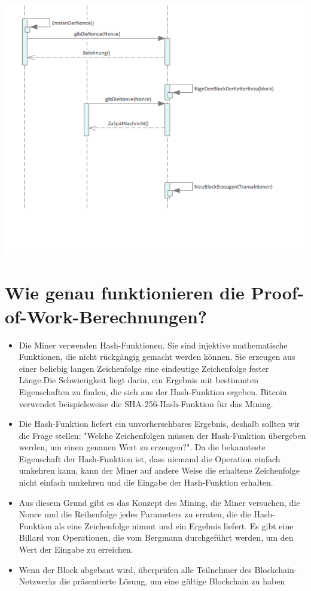 \documentclass[ngerman]{scrreprt}
\begin{document}
\includegraphics[width=\linewidth]{ProofOfWork2.png}
\section{Wie genau funktionieren die Proof-of-Work-Berechnungen?}
\begin{itemize}
	\item {Die Miner verwenden Hash-Funktionen. Sie sind injektive mathematische Funktionen, die nicht rückgängig gemacht werden können. Sie erzeugen aus einer beliebig langen Zeichenfolge eine eindeutige Zeichenfolge fester Länge.Die Schwierigkeit liegt darin, ein Ergebnis mit bestimmten Eigenschaften zu finden, die sich aus der Hash-Funktion ergeben. Bitcoin verwendet beispielsweise die SHA-256-Hash-Funktion für das Mining.}
	\item{Die Hash-Funktion liefert ein unvorhersehbares Ergebnis, deshalb sollten wir die Frage stellen: "Welche Zeichenfolgen müssen der Hash-Funktion übergeben werden, um einen genauen Wert zu erzeugen?". Da die bekannteste Eigenschaft der Hash-Funktion ist, dass niemand die Operation einfach umkehren kann, kann der Miner auf andere Weise die erhaltene Zeichenfolge nicht einfach umkehren und die Eingabe der Hash-Funktion erhalten.}
	\item{Aus diesem Grund gibt es das Konzept des Mining, die Miner versuchen, die Nonce und die Reihenfolge jedes Parameters zu erraten, die die Hash-Funktion als eine Zeichenfolge nimmt und ein Ergebnis liefert. Es gibt eine Billard von Operationen, die vom Bergmann durchgeführt werden, um den Wert der Eingabe zu erreichen.}
	\item{Wenn der Block abgebaut wird, überprüfen alle Teilnehmer des Blockchain-Netzwerks die präsentierte Lösung, um eine gültige Blockchain zu haben}
\end{itemize}
\end{document}
